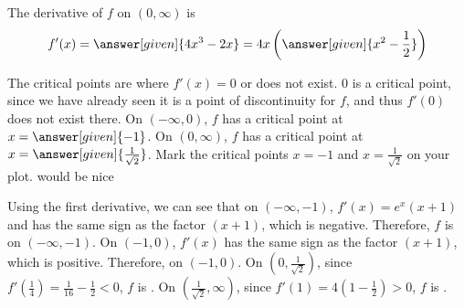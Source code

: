 \documentclass[wordchoicegiven]{ximera}
\begin{document}
\begin{example}
		The derivative of $f$ on $(0, \infty)$ is
		\[
		f'(x)= \answer[given]{4x^3-2x}=4x\left(\answer[given]{x^2-\frac{1}{2}}\right)
		\]
		

The critical points are where $f'(x) = 0$ or does not exist.  $0$ is a
critical point, since we have already seen it is a point of
discontinuity for $f$, and thus $f'(0)$ does not exist there.  On
$(-\infty, 0)$, $f$ has a critical point at $x = \answer[given]{-1}$.
On $(0,\infty)$, $f$ has a critical point at $x =
\answer[given]{\frac{1}{\sqrt{2}}}$.  Mark the critical points $x=-1$
and $x=\frac{1}{\sqrt{2}}$ on your plot. %
would be nice
\begin{image}
\end{image}
Using the first derivative, we can see that on $(-\infty, -1)$,
$f'(x)=e^x(x+1)$ and has the same sign as the factor $(x+1)$, which is
negative. Therefore, $f$ is  on $(-\infty, -1)$.  On $(-1, 0)$,
$f'(x)$ has the same sign as the factor $(x+1)$, which is
positive. Therefore,  on $(-1, 0)$.  On $(0, \frac{1}{\sqrt{2}})$,
since $f'\left(\frac{1}{4}\right)= \frac{1}{16}-\frac{1}{2}<0$, $f$ is
.  On
$\left(\frac{1}{\sqrt{2}}, \infty\right)$, since $f'(1)=
4\left(1-\frac{1}{2}\right)>0$, $f$ is .
\begin{image}

\end{image}
\end{example}
\end{document}
